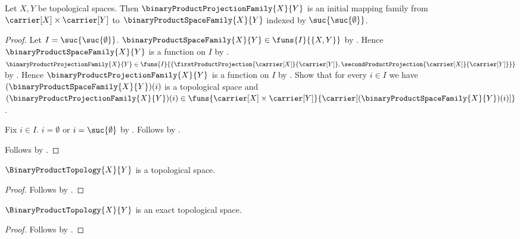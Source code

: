 \begin{proposition}\label{binary_product_initial_data}
    Let $X,Y$ be topological spaces.
    Then $\binaryProductProjectionFamily{X}{Y}$ is an initial mapping
        family from $\carrier[X]\times\carrier[Y]$ to
        $\binaryProductSpaceFamily{X}{Y}$ indexed by
        $\suc{\suc{\emptyset}}$.
\end{proposition}
\begin{proof}
    Let $I=\suc{\suc{\emptyset}}$.
    $\binaryProductSpaceFamily{X}{Y}\in\funs{I}{\{X,Y\}}$ by
        .
    Hence $\binaryProductSpaceFamily{X}{Y}$ is a function on $I$ by
        .
    $\binaryProductProjectionFamily{X}{Y}\in
        \funs{I}{\{
            \firstProductProjection{\carrier[X]}{\carrier[Y]},
            \secondProductProjection{\carrier[X]}{\carrier[Y]}\}}$ by
        .
    Hence $\binaryProductProjectionFamily{X}{Y}$ is a function on $I$ by
        .
    Show that for every $i\in I$ we have
        $(\binaryProductSpaceFamily{X}{Y})(i)$ is a topological space and
        $(\binaryProductProjectionFamily{X}{Y})(i)
            \in\funs{\carrier[X]\times\carrier[Y]}{
                \carrier[(\binaryProductSpaceFamily{X}{Y})(i)]}$.
    \begin{subproof}
        Fix $i\in I$.
        $i=\emptyset$ or $i=\suc{\emptyset}$ by
            .
        Follows by
            .
    \end{subproof}
    Follows by .
\end{proof}

\begin{classification}\label{binary_product_topology_is_topological_space}
    $\BinaryProductTopology{X}{Y}$ is a topological space.
\end{classification}
\begin{proof}
    Follows by
        .
\end{proof}

\begin{theorem}\label{binary_product_topology_is_exact}
    $\BinaryProductTopology{X}{Y}$ is an exact topological space.
\end{theorem}
\begin{proof}
    Follows by
        .
\end{proof}

